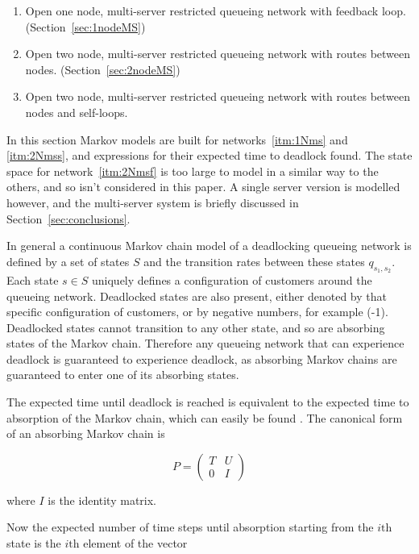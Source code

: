 \documentclass{article}
\numberwithin{equation}{section}
\begin{document}
\begin{enumerate}
  \item Open one node, multi-server restricted queueing network with feedback
  loop. (Section~\ref{sec:1nodeMS}) \label{itm:1Nms}
  \item Open two node, multi-server restricted queueing network with routes
  between nodes. (Section~\ref{sec:2nodeMS}) \label{itm:2Nmss}
  \item Open two node, multi-server restricted queueing network with routes
  between nodes and self-loops. \label{itm:2Nmsf}
\end{enumerate}

In this section Markov models are built for networks~\ref{itm:1Nms} and
\ref{itm:2Nmss}, and expressions for their expected time to deadlock found.
The state space for network~\ref{itm:2Nmsf} is too large to model in a similar
way to the others, and so isn't considered in this paper.
A single server version is modelled however, and the multi-server system is
briefly discussed in Section~\ref{sec:conclusions}.

In general a continuous Markov chain model of a deadlocking queueing network
is defined by a set of states $S$ and the transition rates between these
states $q_{s_1,s_2}$.
Each state $s \in S$ uniquely defines a configuration of customers around the
queueing network.
Deadlocked states are also present, either denoted by that specific
configuration of customers, or by negative numbers, for example (-1).
Deadlocked states cannot transition to any other state, and so are absorbing
states of the Markov chain.
Therefore any queueing network that can experience deadlock is guaranteed to
experience deadlock, as absorbing Markov chains are guaranteed to enter one of
its absorbing states.

The expected time until deadlock is reached is equivalent to the expected time
to absorption of the Markov chain, which can easily be found \cite{stewart09}.
The canonical form of an absorbing Markov chain is

\begin{equation*}
P = \left(\begin{array}{cc} T & U\\ 0 & I \end{array} \right)
\end{equation*}

where $I$ is the identity matrix.

Now the expected number of time steps until absorption starting from the
$i\text{th}$ state is the $i\text{th}$ element of the vector
\end{document}
